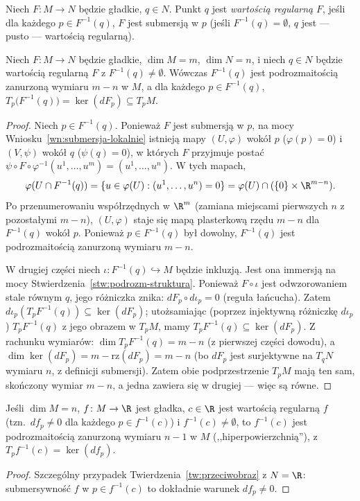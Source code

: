\begin{definicja}
Niech $F\colon M\to N$ będzie gładkie, $q\in N$. Punkt $q$ jest \emph{wartością regularną}
$F$, jeśli dla każdego $p\in F^{-1}(q)$, $F$ jest submersją w $p$ (jeśli $F^{-1}(q)=
\emptyset$, $q$ jest — pusto — wartością regularną).
\end{definicja}

\begin{twierdzenie}\label{tw:przeciwobraz}
Niech $F\colon M\to N$ będzie gładkie, $\dim M=m$, $\dim N=n$, i niech $q\in N$ będzie
wartością regularną $F$ z $F^{-1}(q)\neq\emptyset$. Wówczas $F^{-1}(q)$ jest
podrozmaitością zanurzoną wymiaru $m-n$ w $M$, a dla każdego $p\in F^{-1}(q)$,
$T_p\big(F^{-1}(q)\big)=\ker(dF_p)\subseteq T_pM$.
\end{twierdzenie}
\begin{proof}
Niech $p\in F^{-1}(q)$. Ponieważ $F$ jest submersją w $p$, na mocy
Wniosku~\ref{wn:submersja-lokalnie} istnieją mapy $(U,\varphi)$ wokół $p$ ($\varphi(p)=0$)
i $(V,\psi)$ wokół $q$ ($\psi(q)=0$), w których $F$ przyjmuje postać $\psi\circ F\circ
\varphi^{-1}(u^1,\dots,u^m)=(u^1,\dots,u^n)$. W tych mapach,
\[
\varphi(U\cap F^{-1}(q))=\{u\in\varphi(U):(u^1,\dots,u^n)=0\}=\varphi(U)\cap(\{0\}\times
\R^{m-n}).
\]
Po przenumerowaniu współrzędnych w $\R^m$ (zamiana miejscami pierwszych $n$ z pozostałymi
$m-n$), $(U,\varphi)$ staje się mapą plasterkową rzędu $m-n$ dla $F^{-1}(q)$ wokół $p$.
Ponieważ $p\in F^{-1}(q)$ był dowolny, $F^{-1}(q)$ jest podrozmaitością zanurzoną wymiaru
$m-n$.

W drugiej części niech $\iota\colon F^{-1}(q)\hookrightarrow M$
będzie inkluzją. Jest ona immersją na mocy
Stwierdzenia~\ref{stw:podrozm-struktura}. Ponieważ $F\circ\iota$ jest
odwzorowaniem stale równym $q$, jego różniczka znika: $dF_p\circ d\iota_p=0$ (reguła
łańcucha). Zatem $d\iota_p(T_pF^{-1}(q))\subseteq\ker(dF_p)$; utożsamiając (poprzez
injektywną różniczkę $d\iota_p$) $T_pF^{-1}(q)$ z jego obrazem w $T_pM$, mamy $T_pF^{-1}(q)
\subseteq\ker(dF_p)$. Z rachunku wymiarów: $\dim T_pF^{-1}(q)=m-n$ (z pierwszej części
dowodu), a $\dim\ker(dF_p)=m-\mathrm{rz}(dF_p)=m-n$ (bo $dF_p$ jest surjektywne na $T_qN$
wymiaru $n$, z definicji submersji). Zatem obie podprzestrzenie $T_pM$ mają ten sam,
skończony wymiar $m-n$, a jedna zawiera się w drugiej — więc są równe.
\end{proof}

\begin{wniosek}
Jeśli $\dim M=n$, $f\colon M\to\R$ jest gładka, $c\in\R$ jest wartością regularną $f$ (tzn.\
$df_p\neq0$ dla każdego $p\in f^{-1}(c)$) i $f^{-1}(c)\neq\emptyset$, to $f^{-1}(c)$ jest
podrozmaitością zanurzoną wymiaru $n-1$ w $M$ (,,hiperpowierzchnią''), z $T_pf^{-1}(c)=
\ker(df_p)$.
\end{wniosek}
\begin{proof}
Szczególny przypadek Twierdzenia~\ref{tw:przeciwobraz} z $N=\R$: submersywność $f$ w
$p\in f^{-1}(c)$ to dokładnie warunek $df_p\neq0$.
\end{proof}


